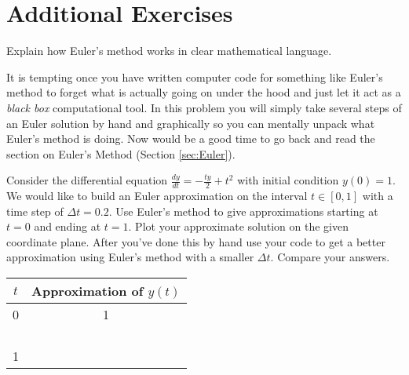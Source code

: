 \newpage\section{Additional Exercises}

\begin{problem}
    Explain how Euler's method works in clear mathematical language.
\end{problem}

\begin{problem}
    It is tempting once you have written computer code for something like Euler's method
    to forget what is actually going on under the hood and just let it act as a {\it black
    box} computational tool.  In this problem you will simply
    take several steps of an Euler solution by hand and graphically so you can mentally
    unpack what Euler's method is doing. Now would be a good time to go back and read the
    section on Euler's Method (Section \ref{sec:Euler}).

    Consider the differential equation $\frac{dy}{dt} = -\frac{ty}{2} + t^2$ with
    initial condition $y(0) = 1$.  We would like to build an Euler approximation on the
    interval $t \in [0,1]$ with a time step of $\Delta t = 0.2$. Use Euler's method to
    give approximations starting at $t=0$ and ending at $t=1$.  Plot your approximate
    solution on the given coordinate plane.  After you've done this by hand use your code
    to get a better approximation using Euler's method with a smaller $\Delta t$.  Compare
    your answers.

    \begin{center}
        \begin{tabular}{|c|c|}
            \hline
            $t$ & Approximation of $y(t)$ \\ \hline \hline
            0 & 1 \\ \hline
            & \\ \hline
            & \\ \hline
            & \\ \hline
            & \\ \hline
            1 & \\ \hline
        \end{tabular}
    \end{center}
    \begin{center}
    \end{center}
\end{problem}

